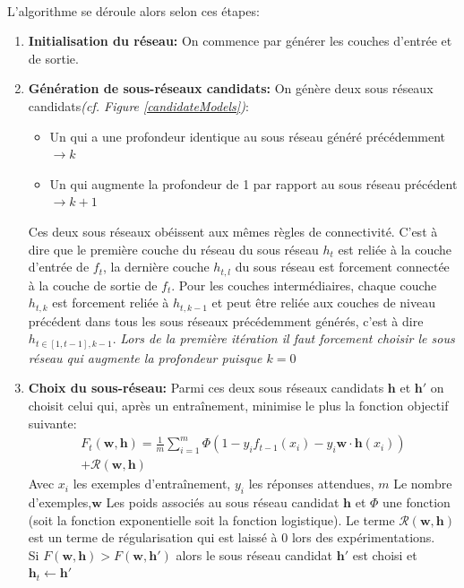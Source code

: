 \documentclass[11 pt]{article}
\begin{document}
\paragraph{}L'algorithme se déroule alors selon ces étapes:
\begin{enumerate}
	\item \textbf{Initialisation du réseau: }On commence par générer les couches d'entrée et de sortie.
	\item \textbf{Génération de sous-réseaux candidats: }On génère deux sous réseaux candidats\emph{(cf. Figure \ref{candidateModels})}:
	\begin{itemize}
		\item Un qui a une profondeur identique au sous réseau généré précédemment $\rightarrow k$
		\item Un qui augmente la profondeur de 1 par rapport au sous réseau précédent $\rightarrow k+1$
	\end{itemize}
	Ces deux sous réseaux obéissent aux mêmes règles de connectivité. C'est à dire que le première couche du réseau du sous réseau $h_t$  est reliée à la couche d'entrée de $f_t$, la dernière couche $h_{t,l}$ du sous réseau est forcement connectée à la couche de sortie de $f_t$. Pour les couches intermédiaires, chaque couche $h_{t,k}$ est forcement reliée à $h_{t,k-1}$ et peut être reliée aux couches de niveau précédent dans tous les sous réseaux précédemment générés, c'est à dire $h_{t\in[1,t-1],k-1}$.
	\emph{Lors de la première itération il faut forcement choisir le sous réseau qui augmente la profondeur puisque $k=0$}
	\item \textbf{Choix du sous-réseau: }Parmi ces deux sous réseaux candidats $\mathbf{h}$ et $\mathbf{h'}$ on choisit celui qui, après un entraînement, minimise le plus la fonction objectif suivante:
	\begin{multline*}
		F_t(\mathbf{w,h}) = \frac{1}{m}\sum^m_{i=1}\Phi(1-y_if_{t-1}(x_i)-y_i\mathbf{w\cdot h}(x_i)) \\
        + \mathcal{R}(\mathbf{w,h})
	\end{multline*}
	Avec $x_i$ les exemples d'entraînement, $y_i$ les réponses attendues, $m$ Le nombre d'exemples,$\mathbf{w}$ Les poids associ\'es au sous réseau candidat $\mathbf{h}$ et $\Phi$ une fonction (soit la fonction exponentielle soit la fonction logistique). Le terme $\mathcal{R}(\mathbf{w,h})$ est un terme de régularisation qui est laiss\'e à $0$ lors des expérimentations.\\
	Si $F(\mathbf{w,h})>F(\mathbf{w,h'})$ alors le sous réseau candidat $\mathbf{h'}$ est choisi et $\mathbf{h}_t \leftarrow \mathbf{h'}$\\

\end{enumerate}
\end{document}
